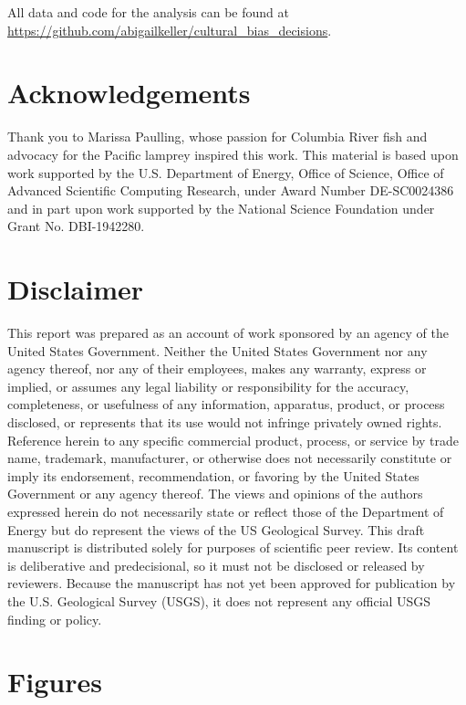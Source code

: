 \documentclass{article}
\begin{document}
All data and code for the analysis can be found at \url{https://github.com/abigailkeller/cultural\_bias\_decisions}.

\section*{Acknowledgements}

Thank you to Marissa Paulling, whose passion for Columbia River fish and advocacy for the Pacific lamprey inspired this work. This material is based upon work supported by the U.S. Department of Energy, Office of Science, Office of Advanced Scientific Computing Research, under Award Number DE-SC0024386 and in part upon work supported by the National Science Foundation under Grant No. DBI-1942280.


\section*{Disclaimer}

This report was prepared as an account of work sponsored by an agency of the United States Government. Neither the United States Government nor any agency thereof, nor any of their employees, makes any warranty, express or implied, or assumes any legal liability or responsibility for the accuracy, completeness, or usefulness of any information, apparatus, product, or process disclosed, or represents that its use would not infringe privately owned rights. Reference herein to any specific commercial product, process, or service by trade name, trademark, manufacturer, or otherwise does not necessarily constitute or imply its endorsement, recommendation, or favoring by the United States Government or any agency thereof. The views and opinions of the authors expressed herein do not necessarily state or reflect those of the Department of Energy but do represent the views of the US Geological Survey. This draft manuscript is distributed solely for purposes of scientific peer review.  Its content is deliberative and predecisional, so it must not be disclosed or released by reviewers. Because the manuscript has not yet been approved for publication by the U.S. Geological Survey (USGS), it does not represent any official USGS finding or policy.

\printbibliography[]

\section*{Figures}
\end{document}
